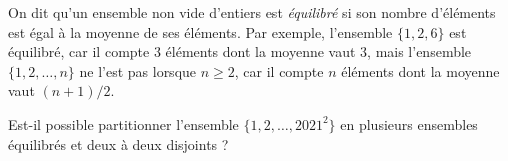 On dit qu'un ensemble non vide d'entiers est \emph{équilibré} si son nombre d'éléments est égal à la moyenne de ses éléments. Par exemple, l'ensemble $\{1,2,6\}$ est équilibré, car il compte $3$ éléments dont la moyenne vaut $3$, mais l'ensemble $\{1,2,\ldots,n\}$ ne l'est pas lorsque $n \geqslant 2$, car il compte $n$ éléments dont la moyenne vaut $(n+1)/2$.

Est-il possible partitionner l'ensemble $\{1,2,\ldots,2021^2\}$ en plusieurs ensembles équilibrés et deux à deux disjoints ?